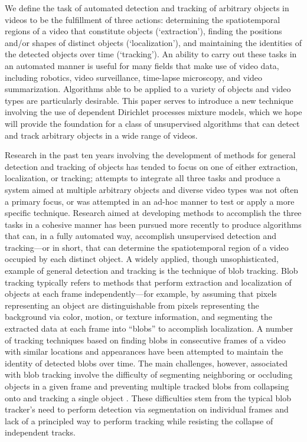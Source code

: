 \documentclass[smallcondensed, final]{svjour3}
\begin{document}
We define the task of automated detection and tracking of arbitrary objects in videos to be the fulfillment of three actions: determining the spatiotemporal regions of a video that constitute objects (`extraction'), finding the positions and/or shapes of distinct objects (`localization'), and maintaining the identities of the detected objects over time (`tracking'). An ability to carry out these tasks in an automated manner is useful for many fields that make use of video data, including robotics, video surveillance, time-lapse microscopy, and video summarization. Algorithms able to be applied to a variety of objects and video types are particularly desirable. This paper serves to introduce a new technique involving the use of dependent Dirichlet processes mixture models, which we hope will provide the foundation for a class of unsupervised algorithms that can detect and track arbitrary objects in a wide range of videos.

Research in the past ten years involving the development of methods for general detection and tracking of objects has tended to focus on one of either extraction, localization, or tracking; attempts to integrate all three tasks and produce a system aimed at multiple arbitrary objects and diverse video types was not often a primary focus, or was attempted in an ad-hoc manner to test or apply a more specific technique. Research aimed at developing methods to accomplish the three tasks in a cohesive manner has been pursued more recently to produce algorithms that can, in a fully automated way, accomplish unsupervised detection and tracking---or in short, that can determine the spatiotemporal region of a video occupied by each distinct object. A widely applied, though unsophisticated, example of general detection and tracking is the technique of blob tracking. Blob tracking typically refers to methods that perform extraction and localization of objects at each frame independently---for example, by assuming that pixels representing an object are distinguishable from pixels representing the background via color, motion, or texture information, and segmenting the extracted data at each frame into ``blobs'' to accomplish localization. A number of tracking techniques based on finding blobs in consecutive frames of a video with similar locations and appearances have been attempted to maintain the identity of detected blobs over time. The main challenges, however, associated with blob tracking involve the difficulty of segmenting neighboring or occluding objects in a given frame \cite{zhao2004tracking} and preventing multiple tracked blobs from collapsing onto and tracking a single object \cite{vermaak_2003}. These difficulties stem from the typical blob tracker's need to perform detection via segmentation on individual frames and lack of a principled way to perform tracking while resisting the collapse of independent tracks.
\end{document}
